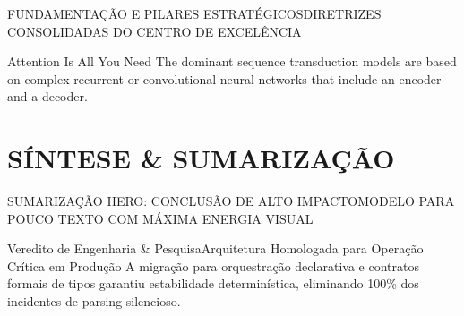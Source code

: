 \documentclass[aspectratio=169,t,xcolor=table]{beamer}
\begin{document}
\begin{frame}{FUNDAMENTAÇÃO E PILARES ESTRATÉGICOS}{DIRETRIZES CONSOLIDADAS DO CENTRO DE EXCELÊNCIA}
    \begin{ceiaquote}{Attention Is All You Need}
        The dominant sequence transduction models are based on complex recurrent or convolutional neural networks that include an encoder and a decoder.
    \end{ceiaquote}
    \vspace{0.2em}
\end{frame}

\section{SÍNTESE \& SUMARIZAÇÃO}
\begin{frame}{SUMARIZAÇÃO HERO: CONCLUSÃO DE ALTO IMPACTO}{MODELO PARA POUCO TEXTO COM MÁXIMA ENERGIA VISUAL}
    \vspace{0.3em}
    \begin{ceiasummarypunch}{Veredito de Engenharia \& Pesquisa}{Arquitetura Homologada para Operação Crítica em Produção}
        A migração para orquestração declarativa e contratos formais de tipos garantiu estabilidade determinística, eliminando 100\% dos incidentes de parsing silencioso.
        \par\vspace{1.2em}
        \noindent
        \hfill
        \hfill
    \end{ceiasummarypunch}
\end{frame}
\end{document}
